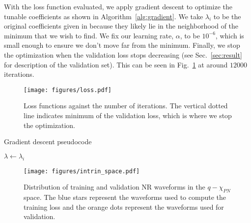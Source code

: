 \documentclass[twocolumn]{aastex631}
\begin{document}
With the loss function evaluated, we apply gradient descent to optimize the tunable
coefficients as shown in Algorithm~\ref{alg:gradient}. We take $\lambda_i$ to be the 
original coefficients given in \citep{khan2016frequency} because they likely lie in the
neighborhood of the minimum that we wish to find. 
We fix our learning rate, $\alpha$, to be $10^{-6}$, which is small enough to ensure we 
don't move far from the minimum.
Finally, we stop the optimization when the validation loss stops decreasing 
(see Sec.~\ref{sec:result} for description of the validation set).
This can be seen in Fig.~\ref{fig:loss} at around $12000$ iterations.

\begin{figure}
	\centering
	\texttt{[image: figures/loss.pdf]}
	\caption{Loss functions against the number of iterations. The vertical
	dotted line indicates minimum of the validation loss, which is where we stop
	the optimization.}
	\label{fig:loss}
\end{figure}

\begin{algorithm}[t]
	\caption{Gradient descent pseudocode}
	\label{alg:gradient}
	    $\lambda\leftarrow\lambda_i$\\
	 \Return{$\lambda$}
\end{algorithm}

\begin{figure}[t]
	\centering
	\texttt{[image: figures/intrin\_space.pdf]}
	\caption{Distribution of training and validation NR waveforms in the
	$q-\chi_{PN}$ space. The blue stars represent the waveforms used to compute
	the training loss and the orange dots represent the waveforms used for
	validation.}
	\label{fig:intrin_space}
\end{figure}
\end{document}
